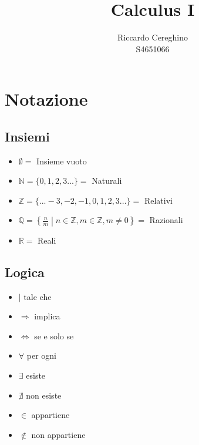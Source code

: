 \documentclass[11pt,a4paper,notitlepage]{report}
\let\numberset\mathbb
\newcommand{\N}{\numberset{N}}
\newcommand{\Z}{\numberset{Z}}
\newcommand{\Q}{\numberset{Q}}
\newcommand{\R}{\numberset{R}}
\begin{document}
\begin{titlepage}
	\title{Calculus I}
	\author{Riccardo Cereghino \\ S4651066}
	\maketitle
	\tableofcontents
\end{titlepage}

\chapter{Notazione}
\section{Insiemi}
\begin{itemize}
	\item $\emptyset = $ Insieme vuoto
	\item $\N = \{0,1,2,3...\} = $ Naturali
	\item $\Z = \{...-3,-2,-1,0,1 ,2,3...\} = $ Relativi
	\item $\Q = \left\{ \frac{n}{m} \middle| n \in \Z , m \in \Z , m \neq 0 \right\} = $ Razionali
	\item $\R = $ Reali
\end{itemize}

\section{Logica}
\begin{itemize}
	\item $| $ tale che
	\item $ \Rightarrow $ implica
	\item $ \Leftrightarrow $ se e solo se
	\item $ \forall $ per ogni
	\item $ \exists $ esiste
	\item $ \nexists $ non esiste
	\item $ \in $ appartiene
	\item $ \notin $ non appartiene
\end{itemize}
\end{document}
